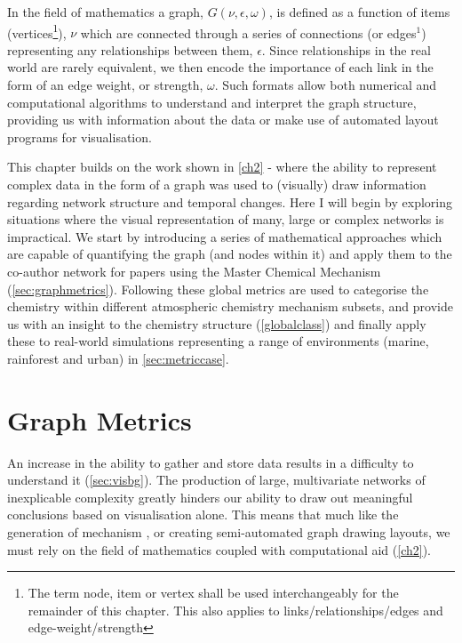 In the field of mathematics a graph, $G(\nu,\epsilon,\omega)$, is defined as a function of items (vertices\footnote{The term node, item or vertex shall be used interchangeably for the remainder of this chapter. This also applies to links/relationships/edges and edge-weight/strength}), $\nu$ which are connected through a series of connections (or edges$^1$) representing any relationships between them, $\epsilon$. Since relationships in the real world are rarely equivalent, we then encode the importance of each link in the form of an edge weight, or strength, $\omega$. Such formats allow both numerical and computational algorithms to understand and interpret the graph structure, providing us with information about the data or make use of automated layout programs for visualisation. 


This chapter builds on the work shown in \autoref{ch2} - where 
the ability to represent complex data in the form of a graph was used to (visually) draw information regarding network structure and temporal changes. Here I will begin by exploring situations where the visual representation of many, large or complex networks is impractical. We start by introducing a series of mathematical approaches which are capable of quantifying the graph (and nodes within it) and apply them to the co-author network for papers using the Master Chemical Mechanism (\autoref{sec:graphmetrics}). Following these global metrics are used to categorise the chemistry within different atmospheric chemistry mechanism subsets, and provide us with an insight to the chemistry structure (\autoref{globalclass}) and finally apply these to real-world simulations representing a range of environments (marine, rainforest and urban) in \autoref{sec:metriccase}.
% 
% 
% 

\section{Graph Metrics}\label{sec:graphmetrics}

An increase in the ability to gather and store data results in a difficulty to understand it (\autoref{sec:visbg}). The production of large, multivariate networks of inexplicable complexity greatly hinders our ability to draw out meaningful conclusions based on visualisation alone. This means that much like the generation of mechanism \citep{protocol}, or creating semi-automated graph drawing layouts, we must rely on the field of mathematics coupled with computational aid (\autoref{ch2}).

